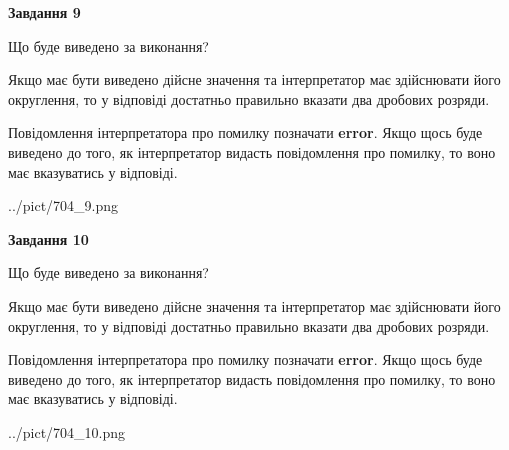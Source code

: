 \documentclass[12pt, ukrainian]{article}
\begin{document}
{\begin {Large}
{\begin {center}\textbf{Завдання 9}\end {center}}\par
Що буде виведено за виконання? \par

Якщо має бути виведено дійсне значення та інтерпретатор має здійснювати його округлення, 
то у відповіді достатньо правильно вказати два дробових розряди.

Повідомлення інтерпретатора про помилку позначати \textbf{error}.
Якщо щось буде виведено до того, як інтерпретатор видасть повідомлення про помилку, 
то воно має вказуватись у відповіді. \par

\begin{center}
	{../pict/704_9.png}
\end{center}
\newpage

{\begin {center}\textbf{Завдання 10}\end {center}}\par
Що буде виведено за виконання? \par

Якщо має бути виведено дійсне значення та інтерпретатор має здійснювати його округлення, 
то у відповіді достатньо правильно вказати два дробових розряди.

Повідомлення інтерпретатора про помилку позначати \textbf{error}.
Якщо щось буде виведено до того, як інтерпретатор видасть повідомлення про помилку, 
то воно має вказуватись у відповіді. \par

\begin{center}
	{../pict/704_10.png}
\end{center}
\newpage

\end {Large}}
\end{document}
